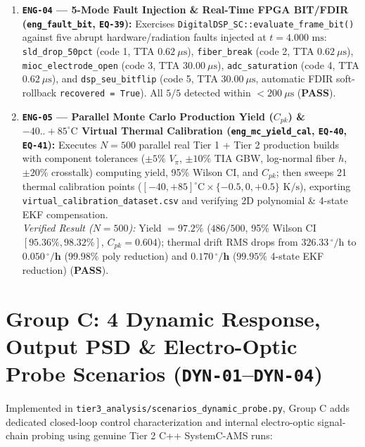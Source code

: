\documentclass[11pt,a4paper]{article}
\begin{document}
\begin{enumerate}
    \item \textbf{\texttt{ENG-04} --- 5-Mode Fault Injection \& Real-Time FPGA BIT/FDIR (\texttt{eng\_fault\_bit}, \texttt{EQ-39}):}
    Exercises \texttt{DigitalDSP\_SC::evaluate\_frame\_bit()} against five abrupt hardware/radiation faults injected at $t = 4.000\text{ ms}$: \texttt{sld\_drop\_50pct} (code 1, TTA $0.62\ \mu\text{s}$), \texttt{fiber\_break} (code 2, TTA $0.62\ \mu\text{s}$), \texttt{mioc\_electrode\_open} (code 3, TTA $30.00\ \mu\text{s}$), \texttt{adc\_saturation} (code 4, TTA $0.62\ \mu\text{s}$), and \texttt{dsp\_seu\_bitflip} (code 5, TTA $30.00\ \mu\text{s}$, automatic FDIR soft-rollback \texttt{recovered = True}). All $5/5$ detected within $< 200\ \mu\text{s}$ (\textbf{PASS}).

    \item \textbf{\texttt{ENG-05} --- Parallel Monte Carlo Production Yield ($C_{pk}$) \& $-40..+85^\circ\text{C}$ Virtual Thermal Calibration (\texttt{eng\_mc\_yield\_cal}, \texttt{EQ-40}, \texttt{EQ-41}):}
    Executes $N = 500$ parallel real Tier 1 + Tier 2 production builds with component tolerances ($\pm 5\%$ $V_\pi$, $\pm 10\%$ TIA GBW, log-normal fiber $h$, $\pm 20\%$ crosstalk) computing yield, 95\% Wilson CI, and $C_{pk}$; then sweeps 21 thermal calibration points ($[-40, +85]^\circ\text{C} \times \{-0.5, 0, +0.5\}\text{ K/s}$), exporting \texttt{virtual\_calibration\_dataset.csv} and verifying 2D polynomial \& 4-state EKF compensation.\\
    \emph{Verified Result ($N=500$):} Yield $= \mathbf{97.2\%}$ ($486/500$, 95\% Wilson CI $[95.36\%, 98.32\%]$, $C_{pk} = 0.604$); thermal drift RMS drops from $326.33\,^\circ/\text{h}$ to $\mathbf{0.050\,^\circ/\text{h}}$ ($\mathbf{99.98\%}$ poly reduction) and $\mathbf{0.170\,^\circ/\text{h}}$ ($\mathbf{99.95\%}$ 4-state EKF reduction) (\textbf{PASS}).
\end{enumerate}

\section{Group C: 4 Dynamic Response, Output PSD \& Electro-Optic Probe Scenarios (\texttt{DYN-01}--\texttt{DYN-04})}

Implemented in \texttt{tier3\_analysis/scenarios\_dynamic\_probe.py}, Group C adds dedicated closed-loop control characterization and internal electro-optic signal-chain probing using genuine Tier 2 C++ SystemC-AMS runs:
\end{document}

